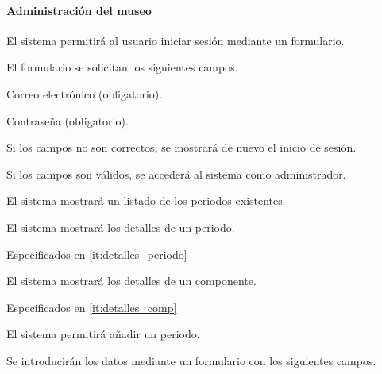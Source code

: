 \paragraph*{Administración del museo}
\begin{myEnumRFA}
	\item El sistema permitirá al usuario iniciar sesión mediante un formulario.
	\begin{myEnumRFA}
		\item El formulario se solicitan los siguientes campos.
		\begin{myEnumRFA}
			\item Correo electrónico (obligatorio).
			\item Contraseña (obligatorio).
		\end{myEnumRFA}
		\item Si los campos no son correctos, se mostrará de nuevo el inicio de sesión.
		\item Si los campos son válidos, se accederá al sistema como administrador.
	\end{myEnumRFA}
	\item El sistema mostrará un listado de los periodos existentes.
	\item El sistema mostrará los detalles de un periodo.
	\begin{myEnumRFA}
		\item Especificados en \ref{it:detalles_periodo}
	\end{myEnumRFA}
	\item El sistema mostrará los detalles de un componente.
	\begin{myEnumRFA}
		\item Especificados en \ref{it:detalles_comp}
	\end{myEnumRFA}
	\item El sistema permitirá añadir un periodo.
	\begin{myEnumRFA}
		\item\label{it:campos_periodo} Se introducirán los datos mediante un formulario con los siguientes campos.

\end{myEnumRFA}
\end{myEnumRFA}
